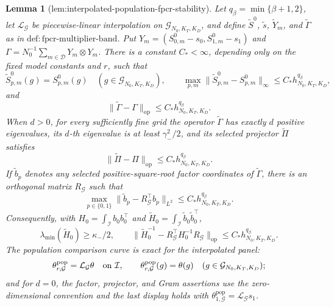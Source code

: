 \documentclass{article}
\newtheorem{lemma}{Lemma}
\begin{document}
\begin{lemma}[lem:interpolated-population-fpcr-stability]\label{lem:interpolated-population-fpcr-stability}
Let \(q_\beta=\min\{\beta+1,2\}\), let \(\mathcal L_{\mathcal G}\) be piecewise-linear interpolation on \(\mathcal G_{N_0,K_T,K_D}\), and define \(\widetilde S^0\), \(\widetilde s\), \(\widetilde Y_m\), and \(\widetilde\Gamma\) as in \(\mathrm{def:fpcr\mbox{-}multiplier\mbox{-}band}\). Put \(Y_m=(S^0_{0,m}-s_0,S^0_{1,m}-s_1)\) and \(\Gamma=N_0^{-1}\sum_{m\in\mathcal D}Y_m\otimes Y_m\). There is a constant \(C_*<\infty\), depending only on the fixed model constants and \(r\), such that
\[
 \widetilde S^0_{p,m}(g)=S^0_{p,m}(g)\quad(g\in\mathcal G_{N_0,K_T,K_D}),
 \qquad
 \max_{p,m}\|\widetilde S^0_{p,m}-S^0_{p,m}\|_\infty
 \le C_*h_{N_0,K_T,K_D}^{q_\beta},
\]
and
\[
 \|\widetilde\Gamma-\Gamma\|_{\mathrm{op}}
 \le C_*h_{N_0,K_T,K_D}^{q_\beta}.
\]
When \(d>0\), for every sufficiently fine grid the operator \(\widetilde\Gamma\) has exactly \(d\) positive eigenvalues, its \(d\)-th eigenvalue is at least \(\gamma_-^2/2\), and its selected projector \(\widetilde\Pi\) satisfies
\[
 \|\widetilde\Pi-\Pi\|_{\mathrm{op}}
 \le C_*h_{N_0,K_T,K_D}^{q_\beta}.
\]
If \(\widetilde b_p\) denotes any selected positive-square-root factor coordinates of \(\widetilde\Gamma\), there is an orthogonal matrix \(R_{\mathcal G}\) such that
\[
 \max_{p\in\{0,1\}}\|\widetilde b_p-R_{\mathcal G}^{\top}b_p\|_{L^2}
 \le C_*h_{N_0,K_T,K_D}^{q_\beta}.
\]
Consequently, with \(H_0=\int_{\mathcal I}b_0b_0^\top\) and \(\widetilde H_0=\int_{\mathcal I}\widetilde b_0\widetilde b_0^\top\),
\[
 \lambda_{\min}(\widetilde H_0)\ge\kappa_-/2,
 \qquad
 \|\widetilde H_0^{-1}-R_{\mathcal G}^{\top}H_0^{-1}R_{\mathcal G}\|_{\mathrm{op}}
 \le C_*h_{N_0,K_T,K_D}^{q_\beta}.
\]
The population comparison curve is exact for the interpolated panel:
\[
 \theta^{\mathrm{pop}}_{r,\mathcal G}=\mathcal L_{\mathcal G}\theta
 \quad\hbox{on }\mathcal I,
 \qquad
 \theta^{\mathrm{pop}}_{r,\mathcal G}(g)=\theta(g)
 \quad(g\in\mathcal G_{N_0,K_T,K_D});
\]
and for \(d=0\), the factor, projector, and Gram assertions use the zero-dimensional convention and the last display holds with \(\theta^{\mathrm{pop}}_{1,\mathcal G}=\mathcal L_{\mathcal G}s_1\).
\end{lemma}
\end{document}
